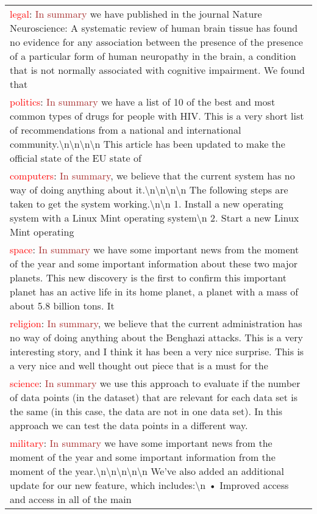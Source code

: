 \begin{table*}
\centering
\small
\begin{tabular}{p{}}
\toprule
\textcolor{red}{legal}: \textcolor{brown}{In summary} we have published in the journal Nature Neuroscience: A systematic review of human brain tissue has found no evidence for any association between the presence of the presence of a particular form of human neuropathy in the brain, a condition that is not normally associated with cognitive impairment. We found that \\
\textcolor{red}{politics}: \textcolor{brown}{In summary} we have a list of 10 of the best and most common types of drugs for people with HIV. This is a very short list of recommendations from a national and international community.\textbackslash n\textbackslash n\textbackslash n\textbackslash n This article has been updated to make the official state of the EU state of \\
\textcolor{red}{computers}: \textcolor{brown}{In summary}, we believe that the current system has no way of doing anything about it.\textbackslash n\textbackslash n\textbackslash n\textbackslash n The following steps are taken to get the system working.\textbackslash n\textbackslash n 1. Install a new operating system with a Linux Mint operating system\textbackslash n 2. Start a new Linux Mint operating \\
\textcolor{red}{space}: \textcolor{brown}{In summary} we have some important news from the moment of the year and some important information about these two major planets. This new discovery is the first to confirm this important planet has an active life in its home planet, a planet with a mass of about 5.8 billion tons. It \\
\textcolor{red}{religion}: \textcolor{brown}{In summary}, we believe that the current administration has no way of doing anything about the Benghazi attacks. This is a very interesting story, and I think it has been a very nice surprise. This is a very nice and well thought out piece that is a must for the \\
\textcolor{red}{science}: \textcolor{brown}{In summary} we use this approach to evaluate if the number of data points (in the dataset) that are relevant for each data set is the same (in this case, the data are not in one data set). In this approach we can test the data points in a different way. \\
\textcolor{red}{military}: \textcolor{brown}{In summary} we have some important news from the moment of the year and some important information from the moment of the year.\textbackslash n\textbackslash n\textbackslash n\textbackslash n\textbackslash n We've also added an additional update for our new feature, which includes:\textbackslash n • Improved access and access in all of the main \\

\end{tabular}
\end{table*}
